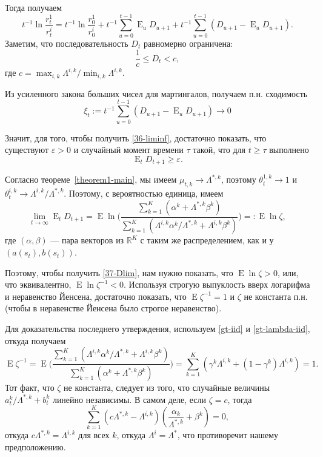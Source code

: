 \documentclass[a4paper,12pt,russian]{article} %
\theoremstyle{definition}
\DeclareMathOperator{\E}{E}
\renewcommand{\epsilon}{\varepsilon}
\newcommand{\R}{\mathbb{R}}
\begin{document}
Тогда получаем
\[
t^{-1} \ln \frac{r_t^1}{r_t^i} 
= t^{-1}\ln\frac{r_0^1}{r_0^i} + t^{-1}\sum_{u=0}^{t-1} \E_u D_{u+1} 
  + t^{-1}\sum_{u=0}^{t-1} (D_{u+1} - \E_u D_{u+1}).
\]
Заметим, что последовательность $D_t$ равномерно ограничена:
\[
\frac{1}{c} \le D_t < c,
\]
где $c=\max_{i,k} \Lambda^{i,k}/ \min_{i,k} \Lambda^{i,k}$.

Из усиленного закона больших чисел для мартингалов, получаем п.н. сходимость
$$\xi_t := t^{-1} \sum_{u=0}^{t-1} (D_{u+1} - \E_u D_{u+1}) \to 0 $$

Значит, для того, чтобы получить \eqref{36-liminf}, достаточно показать, что существуют  $\epsilon>0$ и случайный момент времени $\tau$ такой, что для $t\ge \tau$ выполнено
\begin{equation}
\label{37-Dlim}
\E_t D_{t+1} \ge \epsilon.
\end{equation}

Согласно теореме~\ref{theorem1-main}, мы имеем $\mu_{t,k} \to \Lambda^{*,k}$, поэтому $\theta_{t}^{1,k} \to 1$ и $\theta_{t}^{i,k} \to \Lambda^{i,k}/\Lambda^{*,k}$.
Поэтому, с вероятностью единица, имеем
\[
\lim_{t\to\infty} \E_t D_{t+1} = \E \ln\Biggl(
  \frac{\sum_{k=1}^K (\alpha^k + \Lambda^{*,k}\beta^k)}
       {\sum_{k=1}^K (\Lambda^{i,k} \alpha^k/\Lambda^{*,k} + \Lambda^{i,k}\beta^k)}
  \Biggr) =: \E \ln \zeta,
\]
где $(\alpha,\beta)$ — пара векторов из $\R^K$ с таким же распределением, как и у  $(a(s_t), b(s_t))$.

Поэтому, чтобы получить \eqref{37-Dlim}, нам нужно показать, что $\E \ln \zeta >0$, или, что эквивалентно, $\E \ln \zeta^{-1} < 0$.
Используя строгую выпуклость вверх логарифма и неравенство Йенсена, достаточно показать, что $\E \zeta^{-1} = 1$ и $\zeta$ не константа п.н. (чтобы в неравенстве Йенсена было строгое неравенство). 

Для доказательства последнего утверждения, используем \eqref{gt-iid} и \eqref{gt-lambda-iid}, откуда получаем
\[
\E \zeta^{-1} = \E \Biggl(
  \frac{\sum_{k=1}^K (\Lambda^{i,k} \alpha^k/\Lambda^{*,k}+ \Lambda^{i,k}\beta^k)}
       {\sum_{k=1}^K (\alpha^k + \Lambda^{*,k}\beta^k)}       
  \Biggr) = \sum_{k=1}^K (\gamma^k\Lambda^{i,k} + (1-\gamma^k)\Lambda^{i,k}) = 1.
\]
Тот факт, что $\zeta$ не константа, следует из того, что  случайные величины $a_{t}^k/\Lambda^{*,k} + b_{t}^k$ линейно независимы. В самом деле, если $\zeta=c$, тогда 
\[
\sum_{k=1}^K (c\Lambda^{*,k} - \Lambda^{i,k}) \left( \frac{\alpha_k}{\Lambda^{*,k}} + \beta^k\right) = 0 ,
\]
откуда $c\Lambda^{*,k} = \Lambda^{i,k}$ для всех $k$, откуда $\Lambda^i=\Lambda^*$, что противоречит нашему предположению. 
\end{document}
